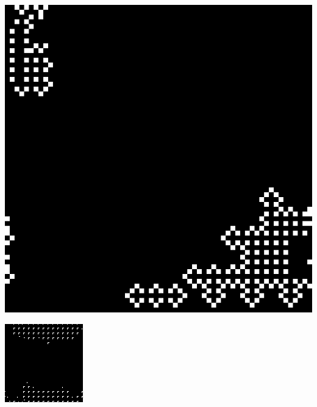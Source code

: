 \documentclass[11pt, oneside]{article}
\newenvironment{Figure}
  {\par\medskip\noindent\minipage{\linewidth}}
  {\endminipage\par\medskip}
\begin{document}
\begin{multicols}{3}
\begin{Figure}
\includegraphics[width=\linewidth]{images/64x64_2_1.png}
\end{Figure}


\begin{Figure}
\includegraphics[width=\linewidth]{images/128x128_2.png}
\end{Figure}


\end{multicols}
\end{document}
